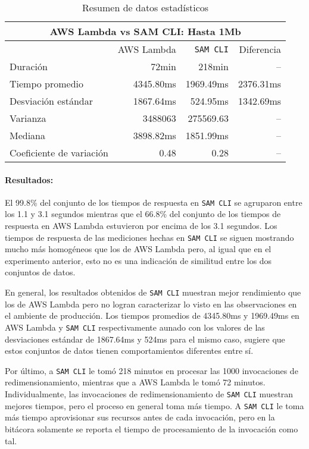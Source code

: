 \begin{table}
    \centering
    \begin{tabular}{l|r|r|r}
        \toprule[1.5pt]
         \multicolumn{4}{c}{\textbf{AWS Lambda vs SAM CLI: Hasta 1Mb}} \\
         \midrule
         & AWS Lambda & \texttt{SAM CLI} & Diferencia \\ 
         \midrule
        Duración & 72min & 218min & -- \\
        Tiempo promedio  & 4345.80ms & 1969.49ms & 2376.31ms\\
        Desviación estándar & 1867.64ms & 524.95ms & 1342.69ms \\
        Varianza & 3488063 & 275569.63 & -- \\
        Mediana & 3898.82ms & 1851.99ms & -- \\
        Coeficiente de variación & 0.48 & 0.28 & -- \\                        
        \bottomrule[1.5pt]
    \end{tabular}
    \caption{Resumen de datos estadísticos}
    \label{table:sam-datos-estadisticos-hasta-1mb}
\end{table}

\paragraph{Resultados:} El 99.8\% del conjunto de los tiempos de respuesta en \texttt{SAM CLI} se agruparon entre los 1.1 y 3.1 segundos mientras que el 66.8\% del conjunto de los tiempos de respuesta en AWS Lambda estuvieron por encima de los 3.1 segundos. Los tiempos de respuesta de las mediciones hechas en \texttt{SAM CLI} se siguen mostrando mucho más homogéneos que los de AWS Lambda pero, al igual que en el experimento anterior, esto no es una indicación de similitud entre los dos conjuntos de datos. 

En general, los resultados obtenidos de \texttt{SAM CLI} muestran mejor rendimiento que los de AWS Lambda pero no logran caracterizar lo visto en las observaciones en el ambiente de producción. Los tiempos promedios de 4345.80ms y 1969.49ms en AWS Lambda y \texttt{SAM CLI} respectivamente aunado con los valores de las desviaciones estándar de 1867.64ms y 524ms para el mismo caso, sugiere que estos conjuntos de datos tienen comportamientos diferentes entre sí.

Por último, a \texttt{SAM CLI} le tomó 218 minutos en procesar las 1000 invocaciones de redimensionamiento, mientras que a AWS Lambda le tomó 72 minutos. Individualmente, las invocaciones de redimensionamiento de \texttt{SAM CLI} muestran mejores tiempos, pero el proceso en general toma más tiempo. A \texttt{SAM CLI} le toma más tiempo aprovisionar sus recursos antes de cada invocación, pero en la bitácora solamente se reporta el tiempo de procesamiento de la invocación como tal.


